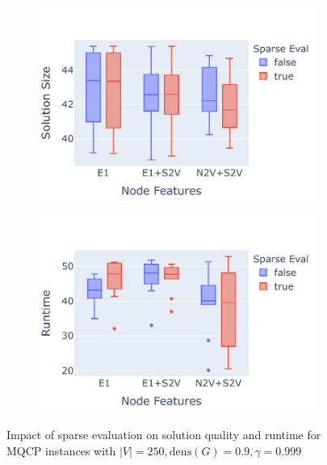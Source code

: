 \documentclass[draft,final]{vutinfth} %
\begin{document}
\begin{figure}
    \centering
    \begin{subfigure}{0.49\textwidth}
        \centering
        \includegraphics[width=\textwidth]{graphics/sparse-eval-1-size.pdf}
    \end{subfigure}
    \begin{subfigure}{0.49\textwidth}
        \centering
        \includegraphics[width=\textwidth]{graphics/sparse-eval-1-runtime.pdf}
    \end{subfigure}
    \caption{Impact of sparse evaluation on solution quality and runtime for MQCP instances with $|V| = 250, \mathrm{dens}(G)=0.9, \gamma=0.999$}
    \label{fig:sparse-evaluation-1}
\end{figure}
\end{document}
